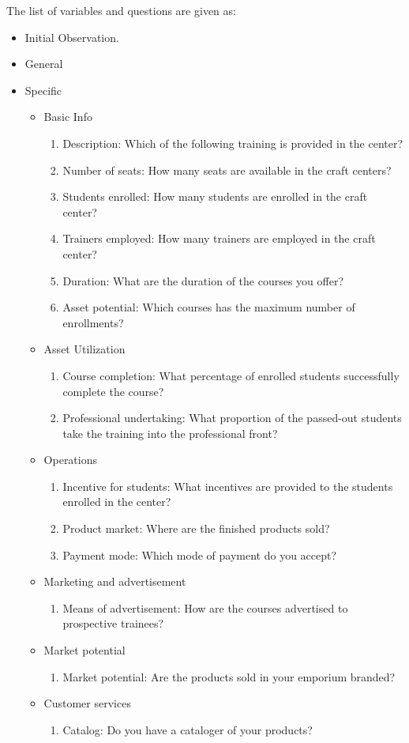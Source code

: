 \documentclass[oneside,twocolumn]{article}
\begin{document}
The list of variables and questions are given as:
\begin{itemize}
	\item Initial Observation.
	\item General
	\item Specific
		\begin{itemize}
			\item Basic Info
				\begin{enumerate}
					\item Description: Which of the following training is provided in the center?
					\item Number of seats: How many seats are available in the craft centers?
					\item Students enrolled: How many students are enrolled in the craft center?
					\item Trainers employed: How many trainers are employed in the craft center?
					\item Duration: What are the duration of the courses you offer?
					\item Asset potential: Which courses has the maximum number of enrollments?
				\end{enumerate}
			\item Asset Utilization
				\begin{enumerate}
					\item Course completion: What percentage of enrolled students successfully complete the course?
					\item Professional undertaking: What proportion of the passed-out students take the training into the professional front?
				\end{enumerate}
			\item Operations
				\begin{enumerate}
					\item Incentive for students: What incentives are provided to the students enrolled in the center?
					\item Product market: Where are the finished products sold?
					\item Payment mode: Which mode of payment do you accept?
				\end{enumerate}
			\item Marketing and advertisement
				\begin{enumerate}
					\item Means of advertisement: How are the courses advertised to prospective trainees?
				\end{enumerate}
			\item Market potential
				\begin{enumerate}
					\item Market potential: Are the products sold in your emporium branded?
				\end{enumerate}
			\item Customer services
				\begin{enumerate}
					\item Catalog: Do you have a cataloger of your products?
				\end{enumerate}
		\end{itemize}
\end{itemize}
\end{document}
